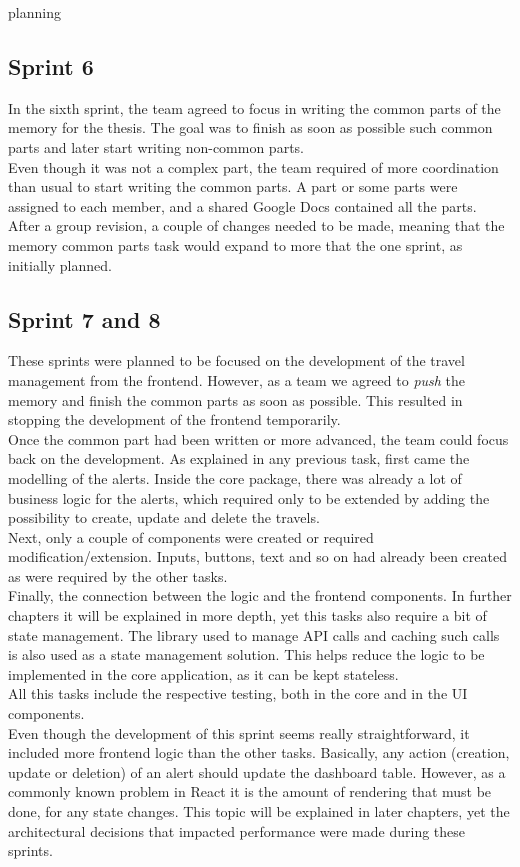 planning\documentclass[../memory.tex]{subfiles}
\begin{document}
\subsection{Sprint 6}
In the sixth sprint, the team agreed to focus in writing the common parts of the
memory for the thesis. The goal was to finish as soon as possible such common
parts and later start writing non-common parts.
\\
Even though it was not a complex part, the team required of more coordination
than usual to start writing the common parts. A part or some parts were assigned
to each member, and a shared Google Docs contained all the parts.
\\
After a group revision, a couple of changes needed to be made, meaning that the
memory common parts task would expand to more that the one sprint, as initially
planned.
\subsection{Sprint 7 and 8}
These sprints were planned to be focused on the development of the travel
management from the frontend. However, as a team we agreed to \emph{push} the
memory and finish the common parts as soon as possible. This resulted in
stopping the development of the frontend temporarily.
\\[8pt]
Once the common part had been written or more advanced, the team could focus
back on the development. As explained in any previous task, first came the
modelling of the alerts. Inside the core package, there was already a lot of
business logic for the alerts, which required only to be extended by adding the
possibility to create, update and delete the travels.
\\
Next, only a couple of components were created or required
modification/extension. Inputs, buttons, text and so on had already been created
as were required by the other tasks.
\\
Finally, the connection between the logic and the frontend components. In
further chapters it will be explained in more depth, yet this tasks also require
a bit of state management. The library used to manage API calls and caching such
calls is also used as a state management solution. This helps reduce the logic
to be implemented in the core application, as it can be kept stateless.
\\
All this tasks include the respective testing, both in the core and in the UI
components.
\\[8pt]
Even though the development of this sprint seems really straightforward, it
included more frontend logic than the other tasks. Basically, any action
(creation, update or deletion) of an alert should update the dashboard table.
However, as a commonly known problem in React it is the amount of rendering that
must be done, for any state changes. This topic will be explained in later
chapters, yet the architectural decisions that impacted performance were made
during these sprints.
\end{document}
